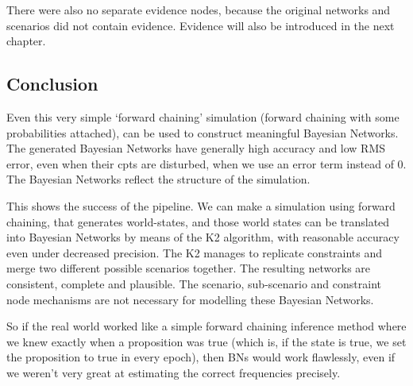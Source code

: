There were also no separate evidence nodes, because the original networks and scenarios did not contain evidence. Evidence will also be introduced in the next chapter.



\subsection{Conclusion}
Even this very simple `forward chaining' simulation (forward chaining with some probabilities attached), can be used to construct meaningful Bayesian Networks. The generated Bayesian Networks have generally high accuracy and low RMS error, even when their cpts are disturbed,  when we use an error term instead of 0. The Bayesian Networks reflect the structure of the simulation. 

This shows the success of the pipeline. We can make a simulation using forward chaining, that generates world-states, and those world states can be translated into Bayesian Networks by means of the K2 algorithm, with reasonable accuracy even under decreased precision. The K2 manages to replicate constraints and merge two different possible scenarios together. The resulting networks are consistent, complete and plausible. The scenario, sub-scenario and constraint node mechanisms are not necessary for modelling these Bayesian Networks.

So if the real world worked like a simple forward chaining inference method where we knew exactly when a proposition was true (which is, if the state is true, we set the proposition to true in every epoch), then BNs would work flawlessly, even if we weren't very great at estimating the correct frequencies precisely.






